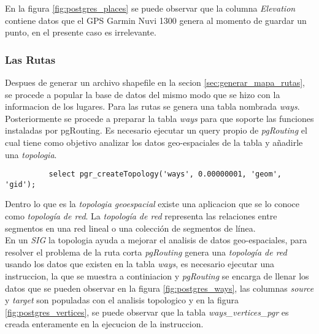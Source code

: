         En la figura \ref{fig:postgres_places} se puede observar que la columna \emph{Elevation} contiene datos que el GPS Garmin Nuvi 1300 genera al momento de guardar un punto, en el presente caso es irrelevante.\\

        \subsubsection{Las Rutas}
        \label{subs:Las Rutas}

        Despues de generar un archivo shapefile en la secion \ref{sec:generar_mapa_rutas}, se procede a popular la base de datos del mismo modo que se hizo con la informacion de los lugares. Para las rutas se genera una tabla nombrada \emph{ways}.\\

        Posteriormente se procede a preparar la tabla \emph{ways} para que soporte las funciones instaladas por pgRouting.
        Es necesario ejecutar un query propio de \emph{pgRouting} el cual tiene como objetivo analizar los datos geo-espaciales de la tabla y a\~nadirle una \emph{topologia}.\\

        \begin{verbatim}
          select pgr_createTopology('ways', 0.00000001, 'geom', 'gid');
        \end{verbatim}

        Dentro lo que es la \emph{topologia geoespacial} existe una aplicacion que se lo conoce como \emph{topología de red}. La \emph{topología de red} representa las relaciones entre segmentos en una red lineal o una colección de segmentos de línea. \cite{osgeo_journal_topology} \\

        En un \emph{SIG} la topologia ayuda a mejorar el analisis de datos geo-espaciales, para resolver el problema de la ruta corta \emph{pgRouting} genera una \emph{topología de red} usando los datos que existen en la tabla \emph{ways}, es necesario ejecutar una instruccion, la que se muestra a continiacion y \emph{pgRouting} se encarga de llenar los datos que se pueden observar en la figura \ref{fig:postgres_ways}, las columnas \emph{source} y \emph{target} son populadas con el analisis topologico y en la figura \ref{fig:postgres_vertices}, se puede observar que la tabla \emph{ways\_vertices\_pgr} es creada enteramente en la ejecucion de la instruccion.\\

